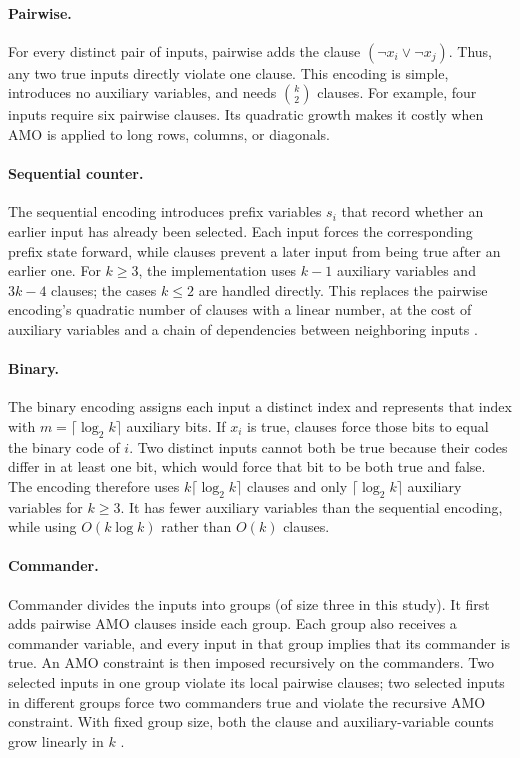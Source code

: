 \documentclass[a4paper,fleqn]{cas-sc}
\begin{document}
\paragraph{Pairwise.}
For every distinct pair of inputs, pairwise adds the clause $(\neg x_i\lor\neg x_j)$. Thus, any two true inputs directly violate one clause. This encoding is simple, introduces no auxiliary variables, and needs $\binom{k}{2}$ clauses. For example, four inputs require six pairwise clauses. Its quadratic growth makes it costly when AMO is applied to long rows, columns, or diagonals.

\paragraph{Sequential counter.}
The sequential encoding introduces prefix variables $s_i$ that record whether an earlier input has already been selected. Each input forces the corresponding prefix state forward, while clauses prevent a later input from being true after an earlier one. For $k\geq3$, the implementation uses $k-1$ auxiliary variables and $3k-4$ clauses; the cases $k\leq2$ are handled directly. This replaces the pairwise encoding's quadratic number of clauses with a linear number, at the cost of auxiliary variables and a chain of dependencies between neighboring inputs \cite{Sinz2005}.

\paragraph{Binary.}
The binary encoding assigns each input a distinct index and represents that index with $m=\lceil\log_2 k\rceil$ auxiliary bits. If $x_i$ is true, clauses force those bits to equal the binary code of $i$. Two distinct inputs cannot both be true because their codes differ in at least one bit, which would force that bit to be both true and false. The encoding therefore uses $k\lceil\log_2 k\rceil$ clauses and only $\lceil\log_2 k\rceil$ auxiliary variables for $k\geq3$. It has fewer auxiliary variables than the sequential encoding, while using $O(k\log k)$ rather than $O(k)$ clauses.

\paragraph{Commander.}
Commander divides the inputs into groups (of size three in this study). It first adds pairwise AMO clauses inside each group. Each group also receives a commander variable, and every input in that group implies that its commander is true. An AMO constraint is then imposed recursively on the commanders. Two selected inputs in one group violate its local pairwise clauses; two selected inputs in different groups force two commanders true and violate the recursive AMO constraint. With fixed group size, both the clause and auxiliary-variable counts grow linearly in $k$ \cite{KlieberKwon2007}.
\end{document}
